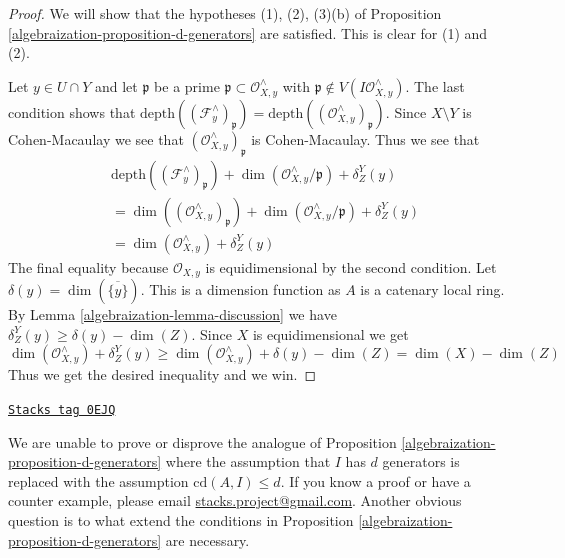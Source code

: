 \begin{proof}

We will show that the hypotheses (1), (2), (3)(b) of
Proposition \ref{algebraization-proposition-d-generators} are satisfied.
This is clear for (1) and (2).

\medskip\noindent
Let $y \in U \cap Y$ and let $\mathfrak p$ be a prime
$\mathfrak p \subset \mathcal{O}_{X, y}^\wedge$ with
$\mathfrak p \not \in V(I\mathcal{O}_{X, y}^\wedge)$.
The last condition shows that
$\text{depth}((\mathcal{F}_y^\wedge)_\mathfrak p) =
\text{depth}((\mathcal{O}_{X, y}^\wedge)_\mathfrak p)$.
Since $X \setminus Y$ is Cohen-Macaulay we see that
$(\mathcal{O}_{X, y}^\wedge)_\mathfrak p$ is Cohen-Macaulay.
Thus we see that
\begin{align*}
& \text{depth}((\mathcal{F}^\wedge_y)_\mathfrak p) +
\dim(\mathcal{O}_{X, y}^\wedge/\mathfrak p) + \delta^Y_Z(y) \\
& =
\dim((\mathcal{O}_{X, y}^\wedge)_\mathfrak p) +
\dim(\mathcal{O}_{X, y}^\wedge/\mathfrak p) + \delta^Y_Z(y) \\
& =
\dim(\mathcal{O}_{X, y}^\wedge) + \delta^Y_Z(y)
\end{align*}
The final equality because $\mathcal{O}_{X, y}$ is equidimensional
by the second condition.
Let $\delta(y) = \dim(\overline{\{y\}})$. This is a dimension function
as $A$ is a catenary local ring.
By Lemma \ref{algebraization-lemma-discussion}
we have $\delta^Y_Z(y) \geq \delta(y) - \dim(Z)$. Since $X$ is
equidimensional we get
$$
\dim(\mathcal{O}_{X, y}^\wedge) + \delta^Y_Z(y)
\geq \dim(\mathcal{O}_{X, y}^\wedge) + \delta(y) - \dim(Z)
= \dim(X) - \dim(Z)
$$
Thus we get the desired inequality and we win.
\end{proof}

\begin{remark}[Question]
\label{algebraization-remark-question}
\href{https://stacks.math.columbia.edu/tag/0EJQ}{\texttt{Stacks tag 0EJQ}}

We are unable to prove or disprove the analogue of
Proposition \ref{algebraization-proposition-d-generators}
where the assumption that $I$ has $d$ generators
is replaced with the assumption $\text{cd}(A, I) \leq d$.
If you know a proof or have a counter example, please email
\href{mailto:stacks.project@gmail.com}{stacks.project@gmail.com}.
Another obvious question is to what extend the conditions in
Proposition \ref{algebraization-proposition-d-generators}
are necessary.
\end{remark}

